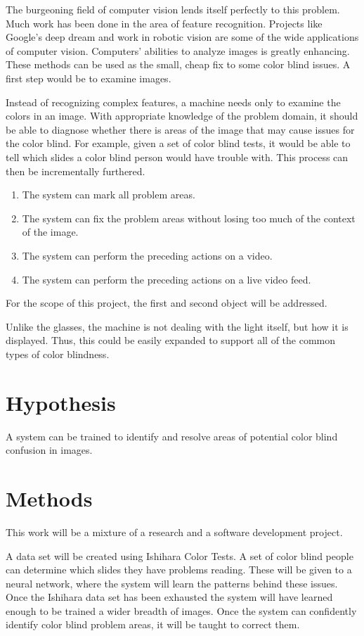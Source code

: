 \documentclass[12pt]{article}
\begin{document}
The burgeoning field of computer vision lends itself perfectly to this problem. Much work has been done in the area of feature recognition. Projects like Google's deep dream and work in robotic vision are some of the wide applications of computer vision. Computers' abilities to analyze images is greatly enhancing. These methods can be used as the small, cheap fix to some color blind issues. A first step would be to examine images.

Instead of recognizing complex features, a machine needs only to examine the colors in an image. With appropriate knowledge of the problem domain, it should be able to diagnose whether there is areas of the image that may cause issues for the color blind. For example, given a set of color blind tests, it would be able to tell which slides a color blind person would have trouble with. This process can then be incrementally furthered.

\begin{enumerate}
	\item The system can mark all problem areas.
	\item The system can fix the problem areas without losing too much of the context of the image.
	\item The system can perform the preceding actions on a video.
	\item The system can perform the preceding actions on a live video feed.
\end{enumerate}

For the scope of this project, the first and second object will be addressed.

Unlike the glasses, the machine is not dealing with the light itself, but how it is displayed. Thus, this could be easily expanded to support all of the common types of color blindness. 


\section{Hypothesis}
A system can be trained to identify and resolve areas of potential color blind confusion in images.


\section{Methods}

This work will be a mixture of a research and a software development project.

 A data set will be created using Ishihara Color Tests. A set of color blind people can determine which slides they have problems reading. These will be given to a neural network, where the system will learn the patterns behind these issues.
 Once the Ishihara data set has been exhausted the system will have learned enough to be trained a wider breadth of images.  Once the system can confidently identify color blind problem areas, it will be taught to correct them. 
 
\end{document}
